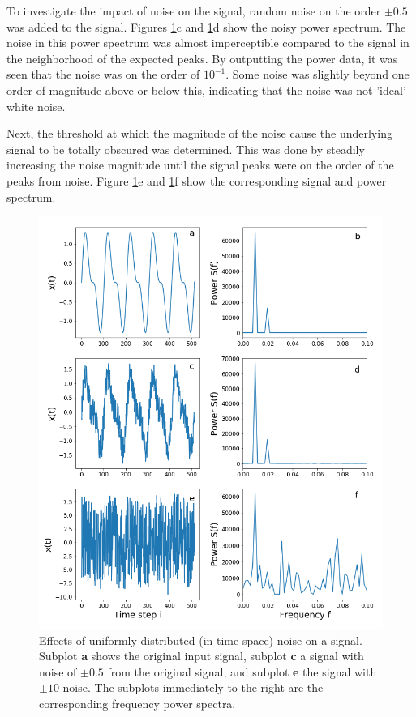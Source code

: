 \documentclass[twocolumn]{article}
\begin{document}
To investigate the impact of noise on the signal, random noise on the order $\pm 0.5$ was added to the signal. Figures \ref{fig:spectral_filter}c and \ref{fig:spectral_filter}d show the noisy power spectrum. The noise in this power spectrum was almost imperceptible compared to the signal in the neighborhood of the expected peaks. By outputting the power data, it was seen that the noise was on the order of $10^{-1}$. Some noise was slightly beyond one order of magnitude above or below this, indicating that the noise was not 'ideal' white noise.

Next, the threshold at which the magnitude of the noise cause the underlying signal to be totally obscured was determined. This was done by steadily increasing the noise magnitude until the signal peaks were on the order of the peaks from noise. Figure \ref{fig:spectral_filter}e and \ref{fig:spectral_filter}f show the corresponding signal and power spectrum.


\begin{figure}[pt!]
	\centering
	\includegraphics[height=\paperwidth]{spectral_filter}
	\caption{Effects of uniformly distributed (in time space) noise on a signal. Subplot \textbf{a} shows the original input signal, subplot \textbf{c} a signal with noise of $\pm0.5$ from the original signal, and subplot \textbf{e} the signal with $\pm10$ noise. The subplots immediately to the right are the corresponding frequency power spectra.}
	\label{fig:spectral_filter}
\end{figure}
\end{document}
